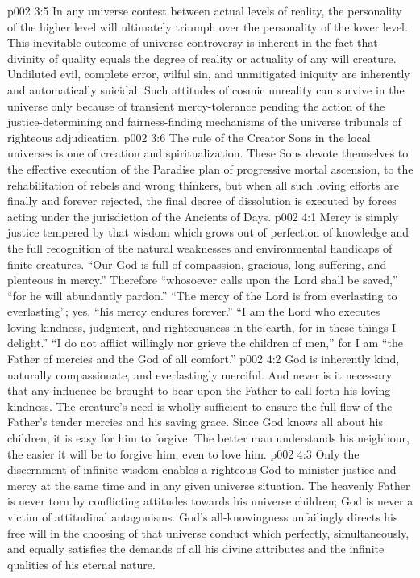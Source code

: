 \vs p002 3:5 \pc In any universe contest between actual levels of reality, the personality of the higher level will ultimately triumph over the personality of the lower level. This inevitable outcome of universe controversy is inherent in the fact that divinity of quality equals the degree of reality or actuality of any will creature. Undiluted evil, complete error, wilful sin, and unmitigated iniquity are inherently and automatically suicidal. Such attitudes of cosmic unreality can survive in the universe only because of transient mercy\hyp{}tolerance pending the action of the justice\hyp{}determining and fairness\hyp{}finding mechanisms of the universe tribunals of righteous adjudication.
\vs p002 3:6 The rule of the Creator Sons in the local universes is one of creation and spiritualization. These Sons devote themselves to the effective execution of the Paradise plan of progressive mortal ascension, to the rehabilitation of rebels and wrong thinkers, but when all such loving efforts are finally and forever rejected, the final decree of dissolution is executed by forces acting under the jurisdiction of the Ancients of Days.
\vs p002 4:1 Mercy is simply justice tempered by that wisdom which grows out of perfection of knowledge and the full recognition of the natural weaknesses and environmental handicaps of finite creatures. “Our God is full of compassion, gracious, long\hyp{}suffering, and plenteous in mercy.” Therefore “whosoever calls upon the Lord shall be saved,” “for he will abundantly pardon.” “The mercy of the Lord is from everlasting to everlasting”; yes, “his mercy endures forever.” “I am the Lord who executes loving\hyp{}kindness, judgment, and righteousness in the earth, for in these things I delight.” “I do not afflict willingly nor grieve the children of men,” for I am “the Father of mercies and the God of all comfort.”
\vs p002 4:2 God is inherently kind, naturally compassionate, and everlastingly merciful. And never is it necessary that any influence be brought to bear upon the Father to call forth his loving\hyp{}kindness. The creature’s need is wholly sufficient to ensure the full flow of the Father’s tender mercies and his saving grace. Since God knows all about his children, it is easy for him to forgive. The better man understands his neighbour, the easier it will be to forgive him, even to love him.
\vs p002 4:3 \pc Only the discernment of infinite wisdom enables a righteous God to minister justice and mercy at the same time and in any given universe situation. The heavenly Father is never torn by conflicting attitudes towards his universe children; God is never a victim of attitudinal antagonisms. God’s all\hyp{}knowingness unfailingly directs his free will in the choosing of that universe conduct which perfectly, simultaneously, and equally satisfies the demands of all his divine attributes and the infinite qualities of his eternal nature.
